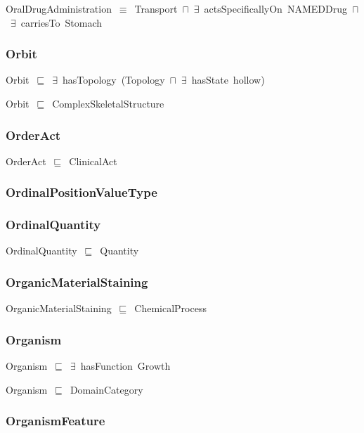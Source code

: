 \documentclass{article}
\begin{document}
OralDrugAdministration~\ensuremath{\equiv}~Transport~\ensuremath{\sqcap}~\ensuremath{\exists}~actsSpecificallyOn~NAMEDDrug~\ensuremath{\sqcap}~\ensuremath{\exists}~carriesTo~Stomach

\subsubsection*{Orbit}

Orbit~\ensuremath{\sqsubseteq}~\ensuremath{\exists}~hasTopology~(Topology~\ensuremath{\sqcap}~\ensuremath{\exists}~hasState~hollow)~

Orbit~\ensuremath{\sqsubseteq}~ComplexSkeletalStructure~

\subsubsection*{OrderAct}

OrderAct~\ensuremath{\sqsubseteq}~ClinicalAct~

\subsubsection*{OrdinalPositionValueType}

\subsubsection*{OrdinalQuantity}

OrdinalQuantity~\ensuremath{\sqsubseteq}~Quantity~

\subsubsection*{OrganicMaterialStaining}

OrganicMaterialStaining~\ensuremath{\sqsubseteq}~ChemicalProcess~

\subsubsection*{Organism}

Organism~\ensuremath{\sqsubseteq}~\ensuremath{\exists}~hasFunction~Growth~

Organism~\ensuremath{\sqsubseteq}~DomainCategory~

\subsubsection*{OrganismFeature}
\end{document}

